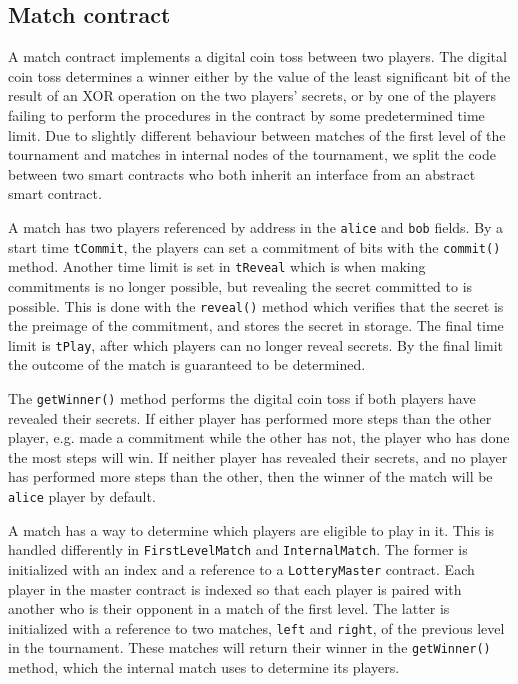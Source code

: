 

\subsection{Match contract}
A match contract implements a digital coin toss between two players. The digital coin toss determines a winner either by the value of the least significant bit of the result of an XOR operation on the two players' secrets, or by one of the players failing to perform the procedures in the contract by some predetermined time limit.
Due to slightly different behaviour between matches of the first level of the tournament and matches in internal nodes of the tournament, we split the code between two smart contracts who both inherit an interface from an abstract smart contract.

A match has two players referenced by address in the \texttt{alice} and \texttt{bob} fields. By a start time \texttt{tCommit}, the players can set a commitment of bits with the \texttt{commit()} method. Another time limit is set in \texttt{tReveal} which is when making commitments is no longer possible, but revealing the secret committed to is possible. This is done with the \texttt{reveal()} method which verifies that the secret is the preimage of the commitment, and stores the secret in storage. The final time limit is \texttt{tPlay}, after which players can no longer reveal secrets. By the final limit the outcome of the match is guaranteed to be determined. 

The \texttt{getWinner()} method performs the digital coin toss if both players have revealed their secrets. If either player has performed more steps than the other player, e.g. made a commitment while the other has not, the player who has done the most steps will win. If neither player has revealed their secrets, and no player has performed more steps than the other, then the winner of the match will be \texttt{alice} player by default.

A match has a way to determine which players are eligible to play in it. This is handled differently in \texttt{FirstLevelMatch} and \texttt{InternalMatch}. The former is initialized with an index and a reference to a \texttt{LotteryMaster} contract. Each player in the master contract is indexed so that each player is paired with another who is their opponent in a match of the first level. The latter is initialized with a reference to two matches, \texttt{left} and \texttt{right}, of the previous level in the tournament. These matches will return their winner in the \texttt{getWinner()} method, which the internal match uses to determine its players. 


